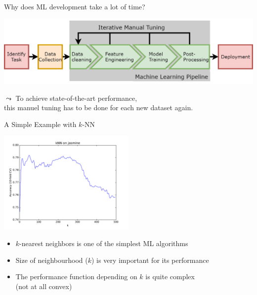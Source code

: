 \begin{frame}[c]{Why does ML development take a lot of time?}

\centering
\includegraphics[width=1.0\textwidth]{images/MLPipeline.jpg}

\bigskip\bigskip\bigskip\bigskip
$\leadsto$ To achieve state-of-the-art performance,\\ this manuel tuning has to be done for each new dataset again.

\end{frame}
\begin{frame}[c]{A Simple Example with $k$-NN}

\centering
\includegraphics[width=0.5\textwidth]{images/kNN-jasmine}

\begin{itemize}
  \item $k$-nearest neighbors is one of the simplest ML algorithms
  \item Size of neighbourhood ($k$) is very important for its performance
  \pause
  \item The performance function depending on $k$ is quite complex\\ (not at all convex)
\end{itemize}

\end{frame}
